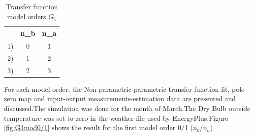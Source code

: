 \documentclass[a4paper,12pt]{article}
\numberwithin{equation}{section}
\begin{document}
\begin{table}[H]
\centering
\begin{tabular}{|c|c|c|}
\hline  & n_{b} & n_{a} \\
\hline 1) & 0 & 1  \\
\hline 2) & 1 & 2  \\
\hline 3) & 2 & 3  \\
\hline
\end{tabular}
\caption{Transfer function model orders $G_{1}$}
\label{table:model order}
\end{table}

\noindent
For each model order, the Non parametric-parametric transfer function fit, pole-zero map and input-output measurements-estimation data  are presented and discussed.The simulation was done for the month of March.The Dry Bulb outside temperature was set to zero in the weather file used by EnergyPlus.Figure \ref{fig:G1mod0/1} shows the result for the first model order 0/1 ($n_{b}$/$n_{a}$)
\end{document}
